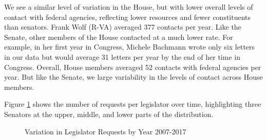 \documentclass[12pt]{article}
\begin{document}
We see a similar level of variation in the House, but with lower overall levels of contact with federal agencies, reflecting lower resources and fewer constituents than senators. Frank Wolf (R-VA) averaged 377 contacts per year. Like the Senate, other members of the House contacted at a much lower rate.
For example, in her first year in Congress,  Michele Bachmann wrote only six letters in our data but would average 31 letters per year by the end of her time in Congress. 
Overall, House members averaged 52 contacts with federal agencies per year. But like the Senate, we large variability in the levels of contact across House members.  

Figure \ref{f:peryear} shows the number of requests per legislator over time, highlighting three Senators at the upper, middle, and lower parts of the distribution.

\begin{figure}
\centering
\caption{Variation in Legislator Requests by Year 2007-2017} \label{f:peryear} 
\begin{minipage}{\textwidth}
\end{minipage}
\end{figure}



\end{document}
